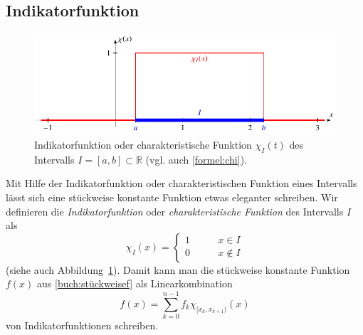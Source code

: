 \subsection{Indikatorfunktion}
\begin{figure}
\centering
\includegraphics{chapters/3-haar/images/chi.pdf}
\caption{Indikatorfunktion oder charakteristische Funktion $\chi_I(t)$
des Intervalls $I=[a,b]\subset \mathbb R$ (vgl. auch \eqref{formel:chi}).
\label{haar:figure:chi}}
\end{figure}
Mit Hilfe der Indikatorfunktion oder charakteristischen Funktion
eines Intervalls lässt sich eine stückweise konstante Funktion etwas
eleganter schreiben.
Wir definieren  die
{\em Indikatorfunktion}
%
oder
{\em charakteristische Funktion}
des Intervalls $I$ als
\begin{equation}
\chi_{I}(x) = \begin{cases}
1&\qquad x\in I\\
0&\qquad x\not\in I
\end{cases}
\label{formel:chi}
\end{equation}
(siehe auch Abbildung~\ref{haar:figure:chi}).
Damit kann man die stückweise konstante Funktion $f(x)$ aus
\eqref{buch:stückweisef}
als Linearkombination
\[
f(x)
=
\sum_{k=0}^{n-1} f_k\chi_{[x_k,x_{k+1})}(x)
\]
von Indikatorfunktionen schreiben.

